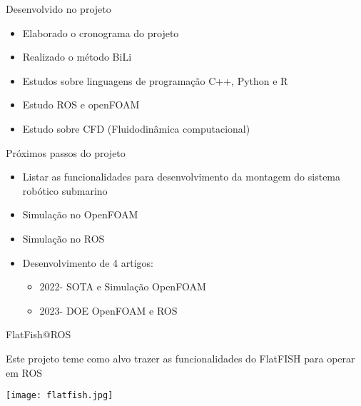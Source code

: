 \begin{frame}[t]{Desenvolvido no projeto}
    \begin{itemize}
        \item Elaborado o cronograma do projeto
        \item Realizado o método BiLi
        \item Estudos sobre linguagens de programação C++, Python e R
        \item Estudo ROS e openFOAM
        \item Estudo sobre CFD (Fluidodinâmica computacional)
    \end{itemize}    
\end{frame}
\begin{frame}[t]{Próximos passos do projeto}
    \begin{itemize}
        \item Listar as funcionalidades para desenvolvimento da montagem do sistema robótico submarino
        \item Simulação no OpenFOAM
        \item Simulação no ROS
        \item Desenvolvimento de 4 artigos: 
        \begin{itemize}
            \item[] 2022- SOTA e Simulação OpenFOAM
            \item[] 2023- DOE OpenFOAM e ROS 
        \end{itemize}   
        
    \end{itemize}    
\end{frame}



\begin{frame}[t]{FlatFish@ROS}

    
    Este projeto teme como alvo trazer as funcionalidades do FlatFISH para operar em ROS
    \begin{center}

    \texttt{[image: flatfish.jpg]}

    \end{center}
    
    
            
\end{frame}


